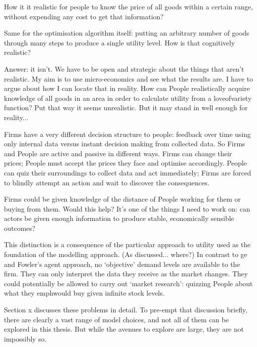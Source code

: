 How it it realistic for people to know the price of all goods within a certain range, without expending any cost to get that information?

Same for the optimisation algorithm itself: putting an arbitrary number of goods through many steps to produce a single utility level. How is that cognitively realistic?

Answer: it isn't. We have to be open and strategic about the things that aren't realistic. My aim is to use micro-economics and see what the results are. I have to argue about how I can locate that in reality. How can People realistically acquire knowledge of all goods in an area in order to calculate utility from a \gls{loveofvariety} function? Put that way it seems unrealistic. But it may stand in well enough for reality...

Firms have a very different decision structure to people: feedback over time using only internal data versus instant decision making from collected data. So Firms and People are active and passive in different ways. Firms can change their prices; People must accept the prices they face and optimise accordingly. People can quiz their surroundings to collect data and act immediately; Firms are forced to blindly attempt an action and wait to discover the consequences. 

Firms could be given knowledge of the distance of People working for them or buying from them. Would this help? It's one of the things I need to work on: can actors be given enough information to produce stable, economically sensible outcomes?

This distinction is a consequence of the particular approach to utility used as the foundation of the modelling approach. (As discussed... where?) In contrast to \gls{ge} and Fowler's agent approach, no `objective' demand levels are available to the firm. They can only interpret the data they receive as the market changes. They could potentially be allowed to carry out `market research': quizzing People about what they emph{would} buy given infinite stock levels. 

Section x  discusses these problems in detail. To pre-empt that discussion briefly, there are clearly a vast range of model choices, and not all of them can be explored in this thesis. But while the avenues to explore are large, they are not impossibly so. 

